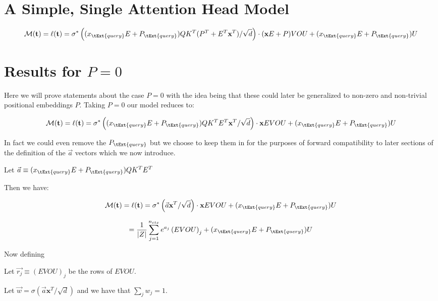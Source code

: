 
\section{A Simple, Single Attention Head Model}


\[\mathcal{M}(\textbf{t}) = \ell(\textbf{t}) = \sigma^* 
 \left ( (x_{\tExt{query}} E + P_{\tExt{query}}) Q K^T  (P^T + E^T \textbf{x}^T) /\sqrt{d} \right ) \cdot (\textbf{x}E+P)VOU + (x_{\tExt{query}}E+P_{\tExt{query}})U\]


\section{Results for $P=0$}
Here we will prove statements about the case $P=0$ with the idea being that these could later be generalized to non-zero and non-trivial positional embeddings $P$.  Taking $P = 0$ our model reduces to:

\[\mathcal{M}(\textbf{t}) = \ell(\textbf{t}) = \sigma^* 
 \left ( (x_{\tExt{query}} E + P_{\tExt{query}}) Q K^T   E^T \textbf{x}^T /\sqrt{d} \right ) \cdot \textbf{x}EVOU + (x_{\tExt{query}}E+P_{\tExt{query}})U\]


 In fact we could even remove the $P_{\tExt{query}}$ but we choose to keep them in for the purposes of forward compatibility to later sections of the definition of the $\vec{a}$ vectors which we now introduce.  

 \begin{definition}[$\vec{a}$]
     Let $\vec{a} \equiv (x_{\tExt{query}} E + P_{\tExt{query}}) Q K^T   E^T$
 \end{definition}

 Then we have:

\[\mathcal{M}(\textbf{t}) = \ell(\textbf{t}) = \sigma^* 
 \left ( \vec{a} \textbf{x}^T /\sqrt{d} \right ) \cdot \textbf{x}EVOU + (x_{\tExt{query}}E+P_{\tExt{query}})U\]


\[ = \frac{1}{|Z|}\sum_{j=1}^{n_{ctx}}  e^{a_j}\left( EVOU \right)_j  +(x_{\tExt{query}}E+P_{\tExt{query}})U \]

Now defining 

\begin{definition}[$\vec{r_j}$]
    Let $\vec{r_j} \equiv \left( EVOU \right)_j$ be the rows of $EVOU$.
\end{definition}

\begin{definition}[$w_j$]
     Let $\vec{w} = \sigma(\vec{a} \mathbf{x}^T / \sqrt{d})$ and we have that $\sum_j w_j = 1$.
    
\end{definition}

